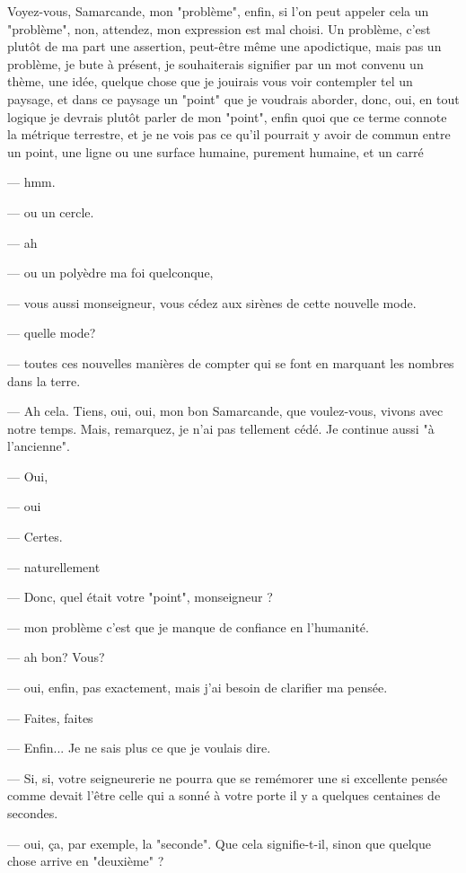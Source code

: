 Voyez-vous, Samarcande, mon "problème", enfin, si l'on peut appeler
cela un "problème", non, attendez, mon expression est mal choisi. Un
problème, c'est plutôt de ma part une assertion, peut-être même une
apodictique, mais pas un problème, je bute à présent, je souhaiterais
signifier par un mot convenu un thème, une idée, quelque chose que je
jouirais vous voir contempler tel un paysage, et dans ce paysage un
"point" que je voudrais aborder, donc, oui, en tout logique je devrais
plutôt parler de mon "point", enfin quoi que ce terme connote la
métrique terrestre, et je ne vois pas ce qu'il pourrait y avoir de
commun entre un point, une ligne ou une surface humaine, purement
humaine, et un carré

--- hmm.

--- ou un cercle.

--- ah

--- ou un polyèdre ma foi quelconque,

--- vous aussi monseigneur, vous cédez aux sirènes de cette nouvelle
mode.

--- quelle mode?

--- toutes ces nouvelles manières de compter qui se font en marquant
les nombres dans la terre.

--- Ah cela. Tiens, oui, oui, mon bon Samarcande, que voulez-vous,
vivons avec notre temps. Mais, remarquez, je n'ai pas tellement
cédé. Je continue aussi "à l'ancienne".

--- Oui, 

--- oui

--- Certes.

--- naturellement

--- Donc, quel était votre "point", monseigneur ?

--- mon problème c'est que je manque de confiance en l'humanité.

--- ah bon? Vous?

--- oui, enfin, pas exactement, mais j'ai besoin de clarifier ma pensée.

--- Faites, faites

--- Enfin... Je ne sais plus ce que je voulais dire.

--- Si, si, votre seigneurerie ne pourra que se remémorer une si
excellente pensée comme devait l'être celle qui a sonné à votre porte
il y a quelques centaines de secondes.

--- oui, ça, par exemple, la "seconde". Que cela signifie-t-il, sinon
que quelque chose arrive en "deuxième" ?

